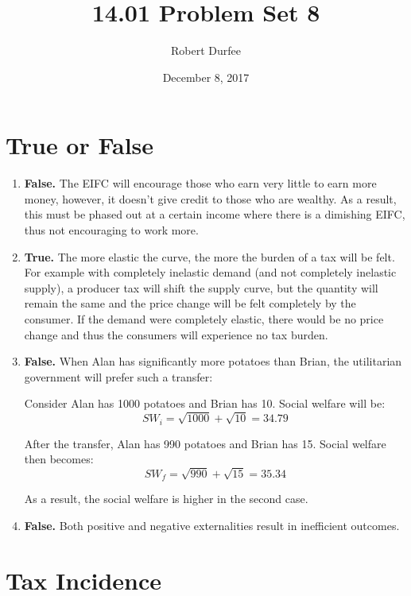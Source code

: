 \documentclass{article}
\title{ 14.01 Problem Set 8 }
\author{ Robert Durfee }
\date{ December 8, 2017 }
\begin{document}
\maketitle

\section{ True or False }

\begin{enumerate}[1.]
    \item \textbf{False.} The EIFC will encourage those who earn very little to
        earn more money, however, it doesn't give credit to those who are
        wealthy. As a result, this must be phased out at a certain income where
        there is a dimishing EIFC, thus not encouraging to work more.

    \item \textbf{True.} The more elastic the curve, the more the burden of a
        tax will be felt. For example with completely inelastic demand (and not
        completely inelastic supply), a producer tax will shift the supply
        curve, but the quantity will remain the same and the price change will
        be felt completely by the consumer. If the demand were completely
        elastic, there would be no price change and thus the consumers will
        experience no tax burden.

    \item \textbf{False.} When Alan has significantly more potatoes than Brian,
        the utilitarian government will prefer such a transfer:

        Consider Alan has 1000 potatoes and Brian has 10. Social welfare will
        be:
        $$ SW_{i} = \sqrt{ 1000 } + \sqrt{ 10 } = 34.79 $$

        After the transfer, Alan has 990 potatoes and Brian has 15. Social
        welfare then becomes:
        $$ SW_{f} = \sqrt{ 990 } + \sqrt{ 15 } = 35.34 $$

        As a result, the social welfare is higher in the second case.

    \item \textbf{False.} Both positive and negative externalities result in
        inefficient outcomes.

\end{enumerate}

\section{ Tax Incidence }
\end{document}
